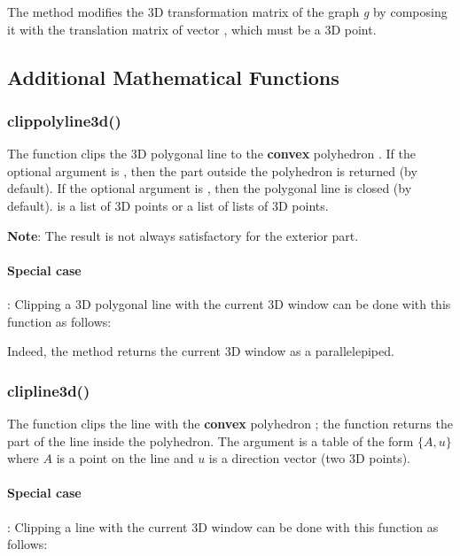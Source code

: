 The  method modifies the 3D transformation matrix of the graph \emph g by composing it with the translation matrix of vector , which must be a 3D point.


\subsection{Additional Mathematical Functions}

\subsubsection{clippolyline3d()}

The function  clips the 3D polygonal line  to the \textbf{convex} polyhedron . If the optional argument  is \true, then the part outside the polyhedron is returned (\false by default). If the optional argument  is \true, then the polygonal line is closed (\false by default).  is a list of 3D points or a list of lists of 3D points.

\textbf{Note}: The result is not always satisfactory for the exterior part.

\paragraph{Special case}: Clipping a 3D polygonal line  with the current 3D window can be done with this function as follows:

Indeed, the  method returns the current 3D window as a parallelepiped.

\subsubsection{clipline3d()}

The function  clips the line  with the \textbf{convex} polyhedron ; the function returns the part of the line inside the polyhedron. The argument  is a table of the form $\{A,u\}$ where $A$ is a point on the line and $u$ is a direction vector (two 3D points).

\paragraph{Special case}: Clipping a line  with the current 3D window can be done with this function as follows:

